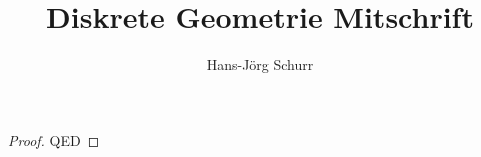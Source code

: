 \documentclass{scrartcl}
\title{Diskrete Geometrie Mitschrift}
\author{Hans-Jörg Schurr}
\begin{document}
\maketitle
\tableofcontents

\begin{proof}
QED
\end{proof}
\end{document}
